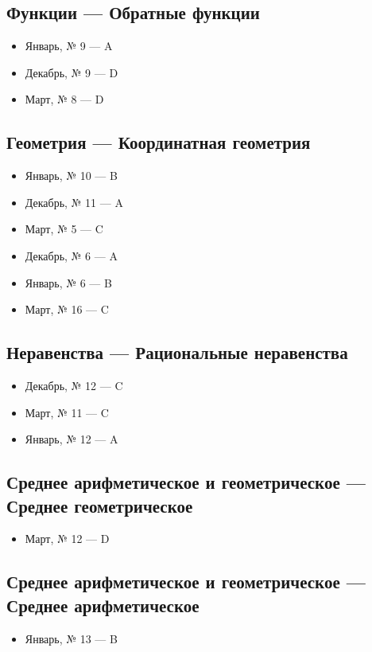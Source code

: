 \subsection*{Функции — Обратные функции}
\begin{itemize}
\item Январь, № 9 — A
\item Декабрь, № 9 — D
\item Март, № 8 — D
\end{itemize}

\subsection*{Геометрия — Координатная геометрия}
\begin{itemize}
\item Январь, № 10 — B
\item Декабрь, № 11 — A
\item Март, № 5 — C
\item Декабрь, № 6 — A
\item Январь, № 6 — B
\item Март, № 16 — C
\end{itemize}

\subsection*{Неравенства — Рациональные неравенства}
\begin{itemize}
\item Декабрь, № 12 — C
\item Март, № 11 — C
\item Январь, № 12 — A
\end{itemize}

\subsection*{Среднее арифметическое и геометрическое — Среднее геометрическое}
\begin{itemize}
\item Март, № 12 — D
\end{itemize}

\subsection*{Среднее арифметическое и геометрическое — Среднее арифметическое}
\begin{itemize}
\item Январь, № 13 — B
\end{itemize}

